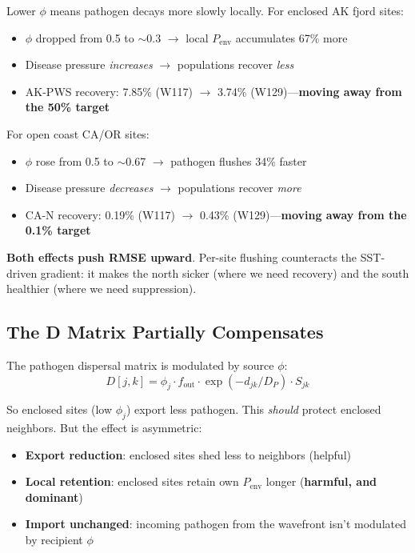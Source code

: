 \documentclass[11pt]{article}
\begin{document}
Lower $\phi$ means pathogen decays more slowly locally. For enclosed AK fjord sites:
\begin{itemize}
    \item $\phi$ dropped from 0.5 to $\sim$0.3 $\rightarrow$ local $P_\text{env}$ accumulates 67\% more
    \item Disease pressure \textit{increases} $\rightarrow$ populations recover \textit{less}
    \item AK-PWS recovery: 7.85\% (W117) $\rightarrow$ 3.74\% (W129)---\textbf{moving away from the 50\% target}
\end{itemize}

For open coast CA/OR sites:
\begin{itemize}
    \item $\phi$ rose from 0.5 to $\sim$0.67 $\rightarrow$ pathogen flushes 34\% faster
    \item Disease pressure \textit{decreases} $\rightarrow$ populations recover \textit{more}
    \item CA-N recovery: 0.19\% (W117) $\rightarrow$ 0.43\% (W129)---\textbf{moving away from the 0.1\% target}
\end{itemize}

\textbf{Both effects push RMSE upward}. Per-site flushing counteracts the SST-driven gradient: it makes the north sicker (where we need recovery) and the south healthier (where we need suppression).

\subsection{The D Matrix Partially Compensates}

The pathogen dispersal matrix is modulated by source $\phi$:
$$D[j,k] = \phi_j \cdot f_\text{out} \cdot \exp(-d_{jk}/D_P) \cdot S_{jk}$$

So enclosed sites (low $\phi_j$) export less pathogen. This \textit{should} protect enclosed neighbors. But the effect is asymmetric:
\begin{itemize}
    \item \textbf{Export reduction}: enclosed sites shed less to neighbors (helpful)
    \item \textbf{Local retention}: enclosed sites retain own $P_\text{env}$ longer (\textbf{harmful, and dominant})
    \item \textbf{Import unchanged}: incoming pathogen from the wavefront isn't modulated by recipient $\phi$
\end{itemize}
\end{document}
